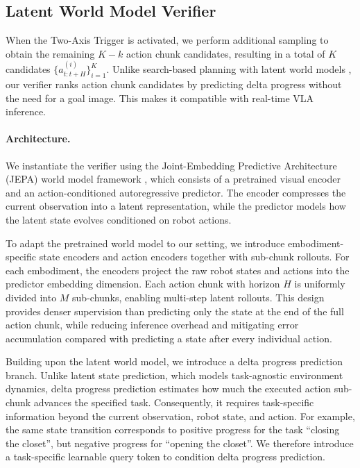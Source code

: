\documentclass[10pt,twocolumn,letterpaper]{article}
\begin{document}
\subsection{Latent World Model Verifier}

When the Two-Axis Trigger is activated, we perform additional sampling to obtain the remaining $K-k$ action chunk candidates, resulting in a total of $K$ candidates $\{a_{t:t+H}^{(i)}\}_{i=1}^K$. Unlike search-based planning with latent world models \cite{zhou2025dinowmworldmodelspretrained, assran2025vjepa2selfsupervisedvideo}, our verifier ranks action chunk candidates by predicting delta progress without the need for a goal image. This makes it compatible with real-time VLA inference.

\paragraph{Architecture.}

We instantiate the verifier using the Joint-Embedding Predictive Architecture (JEPA) world model framework \cite{assran2025vjepa2selfsupervisedvideo,murlabadia2026vjepa21unlockingdense}, which consists of a pretrained visual encoder and an action-conditioned autoregressive predictor. The encoder compresses the current observation into a latent representation, while the predictor models how the latent state evolves conditioned on robot actions.

To adapt the pretrained world model to our setting, we introduce embodiment-specific state encoders and action encoders together with sub-chunk rollouts. For each embodiment, the encoders project the raw robot states and actions into the predictor embedding dimension. Each action chunk with horizon $H$ is uniformly divided into $M$ sub-chunks, enabling multi-step latent rollouts. This design provides denser supervision than predicting only the state at the end of the full action chunk, while reducing inference overhead and mitigating error accumulation compared with predicting a state after every individual action.

Building upon the latent world model, we introduce a delta progress prediction branch. Unlike latent state prediction, which models task-agnostic environment dynamics, delta progress prediction estimates how much the executed action sub-chunk advances the specified task. Consequently, it requires task-specific information beyond the current observation, robot state, and action. For example, the same state transition corresponds to positive progress for the task ``closing the closet'', but negative progress for ``opening the closet''. We therefore introduce a task-specific learnable query token to condition delta progress prediction.
\end{document}
